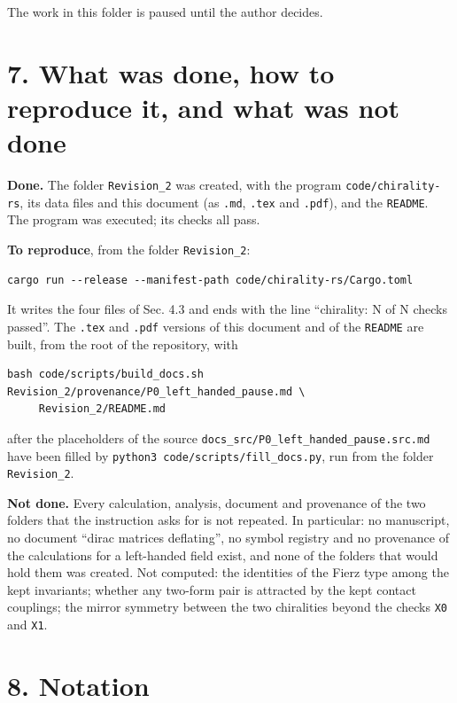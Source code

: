 \documentclass[
  10pt,
]{article}
\begin{document}
The work in this folder is paused until the author decides.

\hypertarget{what-was-done-how-to-reproduce-it-and-what-was-not-done}{%
\section{7. What was done, how to reproduce it, and what was not
done}\label{what-was-done-how-to-reproduce-it-and-what-was-not-done}}

\textbf{Done.} The folder \texttt{Revision\_2} was created, with the
program \texttt{code/chirality-rs}, its data files and this document (as
\texttt{.md}, \texttt{.tex} and \texttt{.pdf}), and the \texttt{README}.
The program was executed; its checks all pass.

\textbf{To reproduce}, from the folder \texttt{Revision\_2}:

\begin{verbatim}
cargo run --release --manifest-path code/chirality-rs/Cargo.toml
\end{verbatim}

It writes the four files of Sec. 4.3 and ends with the line ``chirality:
N of N checks passed''. The \texttt{.tex} and \texttt{.pdf} versions of
this document and of the \texttt{README} are built, from the root of the
repository, with

\begin{verbatim}
bash code/scripts/build_docs.sh Revision_2/provenance/P0_left_handed_pause.md \
     Revision_2/README.md
\end{verbatim}

after the placeholders of the source
\texttt{docs\_src/P0\_left\_handed\_pause.src.md} have been filled by
\texttt{python3\ code/scripts/fill\_docs.py}, run from the folder
\texttt{Revision\_2}.

\textbf{Not done.} Every calculation, analysis, document and provenance
of the two folders that the instruction asks for is not repeated. In
particular: no manuscript, no document ``dirac matrices deflating'', no
symbol registry and no provenance of the calculations for a left-handed
field exist, and none of the folders that would hold them was created.
Not computed: the identities of the Fierz type among the kept
invariants; whether any two-form pair is attracted by the kept contact
couplings; the mirror symmetry between the two chiralities beyond the
checks \texttt{X0} and \texttt{X1}.

\hypertarget{notation}{%
\section{8. Notation}\label{notation}}
\end{document}
